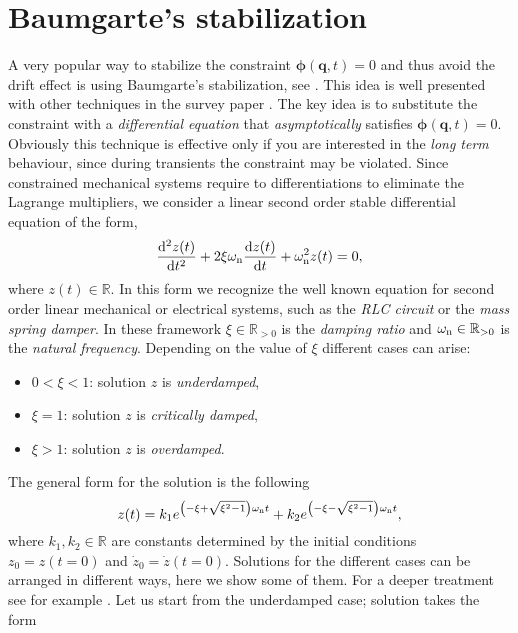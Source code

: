 	\section{Baumgarte's stabilization}
		A very popular way to stabilize the constraint $\bm{\phi}(\bm{q},t)=0$ and thus avoid the drift effect is using Baumgarte's stabilization, see \cite{baumgarte1972stabilization}. This idea is well presented with other techniques in the survey paper \cite{ascher1995stabilization}. The key idea is to substitute the constraint with a \emph{differential equation} that \emph{asymptotically} satisfies $\bm{\phi}(\bm{q},t)=0$. Obviously this technique is effective only if you are interested in the \emph{long term} behaviour, since during transients the constraint may be violated. Since constrained mechanical systems require to differentiations to eliminate the Lagrange multipliers, we consider a linear second order stable differential equation of the form, 
		\begin{equation}
			\label{eq:secondordersystem}
			\frac{\mathop{}\!\mathrm{d}^2 z(t)}{\mathop{}\!\mathrm{d} t^2} + 2\xi\omega_{\textnormal{n}}\frac{\mathop{}\!\mathrm{d} z(t)}{\mathop{}\!\mathrm{d} t} + \omega_{\textnormal{n}}^2z(t) = 0,
		\end{equation}  
		where $z(t)\in\mathbb{R}$. In this form we recognize the well known equation for second order linear mechanical or electrical systems, such as the \emph{RLC circuit} or the \emph{mass spring damper}. In these framework $\xi\in\mathbb{R}_{>0}$ is the \emph{damping ratio} and $\omega_{\textnormal{n}}\in\mathbb{R}_{>0}$ is the \emph{natural frequency}. Depending on the value of $\xi$ different cases can arise:
		\begin{itemize}
			\item $0<\xi<1$: solution $z$ is \emph{underdamped},
			\item $\xi=1$: solution $z$ is \emph{critically damped},
			\item $\xi>1$: solution $z$ is \emph{overdamped}.
		\end{itemize}
		The general form for the solution is the following
		\begin{equation*}
			z(t) = k_{1}e^{\left(-\xi+\sqrt{\xi^2-1}\right)\omega_{\textnormal{n}}t} + k_{2}e^{\left(-\xi-\sqrt{\xi^2-1}\right)\omega_{\textnormal{n}}t}, 
		\end{equation*}
		where $k_{1},k_{2}\in\mathbb{R}$ are constants determined by the initial conditions $z_{0} = z(t=0)$ and $\dot{z}_{0} = \dot{z}(t=0)$. Solutions for the different cases can be arranged in different ways, here we show some of them. For a deeper treatment see for example \cite{rao1995mechanical}. Let us start from the underdamped case; solution takes the form

